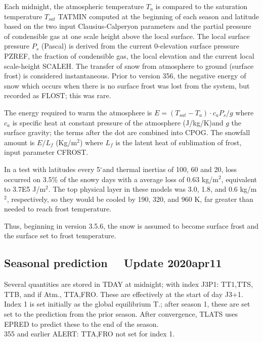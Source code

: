 \documentclass{article}
\newcommand{\qd}{$^\circ$}        %
\begin{document}
 Each midnight, the atmospheric temperature $T_a$ is compared to the saturation
 temperature $T_{sat}$ TATMIN computed at the beginning of each season and
 latitude based on the two input Clausius-Calperyon parameters and the partial
 pressure of condensible gas at one scale height above the local surface. The
 local surface pressure $P_s$ (Pascal) is derived from the current 0-elevation
 surface pressure PZREF, the fraction of condensible gas, the local elevation
 and the current local scale-height SCALEH. The transfer of snow from atmosphere
 to ground (surface frost) is considered instantaneous. Prior to version 356,
 the negative energy of snow which occurs when there is no surface frost was lost
 from the system, but recorded as FLOST; this was rare.

 The energy required to warm the atmosphere is $E= (T_{sat}-T_a) \cdot c_a
 P_s/g$ where $c_a$ is specific heat at constant pressure of the atmosphere
 (J/kg/K)and $g$ the surface gravity; the terms after the dot are combined into
 CPOG. The snowfall amount is $E/L_f$ (Kg/m$^2$) where $L_f$ is the latent heat of
 sublimation of frost, input parameter CFROST.

 In a test with latitudes every 5\qd and thermal inertias of 100, 60 and 20,
 loss occurred on 3.5\% of the snowy days with a average loss of 0.63 kg/m$^2$,
 equivalent to 3.7E5 J/m$^2$. The top physical layer in these models was 3.0,
 1.8, and 0.6 kg/m$^2$, respectively, so they would be cooled by 190, 320, and
 960 K, far greater than needed to reach frost temperature.

Thus, beginning in version 3.5.6, the snow is assumed to become surface frost
and the surface set to frost temperature.


\subsection{Seasonal prediction \ \  Update 2020apr11} %

Several quantities are stored in TDAY at midnight;
 with index J3P1: TT1,TTS, TTB, and if Atm., TTA,FRO. These are effectively at the start of day J3+1. Index 1 is set initially as the global equilibrium T.; after season 1, these are set set to the prediction from the prior season.
After convergence, TLATS uses EPRED to predict these to the end of the season.
\\ 355 and earlier ALERT:  TTA,FRO not set for index 1.
\end{document}
